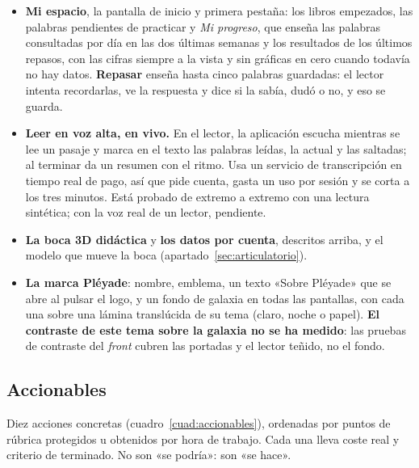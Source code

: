 \documentclass[11pt,a4paper]{article}
\begin{document}
\begin{itemize}
  \item \textbf{Mi espacio}, la pantalla de inicio y primera pestaña: los libros empezados,
        las palabras pendientes de practicar y \emph{Mi progreso}, que enseña las palabras
        consultadas por día en las dos últimas semanas y los resultados de los últimos
        repasos, con las cifras siempre a la vista y sin gráficas en cero cuando todavía no
        hay datos. \textbf{Repasar} enseña hasta cinco palabras guardadas: el lector intenta
        recordarlas, ve la respuesta y dice si la sabía, dudó o no, y eso se guarda.
  \item \textbf{Leer en voz alta, en vivo.} En el lector, la aplicación escucha mientras se
        lee un pasaje y marca en el texto las palabras leídas, la actual y las saltadas; al
        terminar da un resumen con el ritmo. Usa un servicio de transcripción en tiempo real
        de pago, así que pide cuenta, gasta un uso por sesión y se corta a los tres minutos.
        Está probado de extremo a extremo con una lectura sintética; con la voz real de un
        lector, pendiente.
  \item \textbf{La boca 3D didáctica} y \textbf{los datos por cuenta}, descritos arriba, y el
        modelo que mueve la boca (apartado~\ref{sec:articulatorio}).
  \item \textbf{La marca Pléyade}: nombre, emblema, un texto «Sobre Pléyade» que se abre al
        pulsar el logo, y un fondo de galaxia en todas las pantallas, con cada una sobre una
        lámina translúcida de su tema (claro, noche o papel). \textbf{El contraste de este
        tema sobre la galaxia no se ha medido}: las pruebas de contraste del \emph{front}
        cubren las portadas y el lector teñido, no el fondo.
\end{itemize}

\subsection{Accionables}

Diez acciones concretas (cuadro~\ref{cuad:accionables}), ordenadas por puntos de rúbrica
protegidos u obtenidos por hora de trabajo. Cada una lleva coste real y criterio de
terminado. No son «se podría»: son «se hace».
\end{document}

